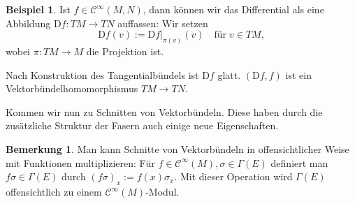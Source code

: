 \documentclass[a4paper]{scrbook}
\numberwithin{equation}{chapter}
\newcommand{\DD}{\mathrm{D}}
\newcommand{\sC}{\mathcal{C}^{\infty}}
\theoremstyle{definition}
\newtheorem{bem}[defn]{Bemerkung}
\newtheorem{bsp}[defn]{Beispiel}
\begin{document}
		\begin{bsp}
			Ist $f\in\sC(M,N)$, dann können wir das Differential als eine Abbildung $\DD f\colon TM \to TN$ auffassen: Wir setzen
			\[\DD f(v) := \left.\DD f\right|_{\pi(v)}(v) \quad \text{für} \; v \in TM,\]
			wobei $\pi\colon TM\to M$ die Projektion ist.
			
			Nach Konstruktion des Tangentialbündels ist $\DD f$ glatt. $(\DD f,f)$ ist ein Vektorbündelhomomorphismus $TM \to TN$.
		\end{bsp}
		
		Kommen wir nun zu Schnitten von Vektorbündeln. Diese haben durch die zusätzliche Struktur der Fasern auch einige neue Eigenschaften.		
		\begin{bem}
			Man kann Schnitte von Vektorbündeln in offensichtlicher Weise mit Funktionen multiplizieren: Für $f \in \sC(M), \sigma \in \Gamma(E)$ definiert man $f\sigma \in \Gamma(E)$ durch $(f\sigma)_x := f(x) \sigma_x$. Mit dieser Operation wird $\Gamma(E)$ offensichtlich zu einem $\sC(M)$-Modul.
		\end{bem}
\end{document}
